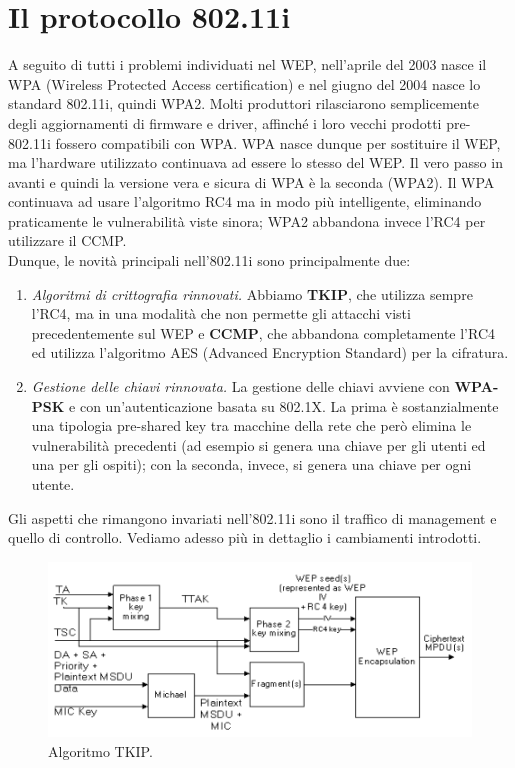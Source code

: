\section{Il protocollo 802.11i}
A seguito di tutti i problemi individuati nel WEP, nell'aprile del 2003 nasce il WPA (Wireless Protected Access certification) e nel giugno del 2004 nasce lo standard 802.11i, quindi WPA2. Molti produttori rilasciarono semplicemente degli aggiornamenti di firmware e driver, affinché i loro vecchi prodotti pre-802.11i fossero compatibili con WPA. WPA nasce dunque per sostituire il WEP, ma l'hardware utilizzato continuava ad essere lo stesso del WEP. Il vero passo in avanti e quindi la versione vera e sicura di WPA è la seconda (WPA2). Il WPA continuava ad usare l'algoritmo RC4 ma in modo più intelligente, eliminando praticamente le vulnerabilità viste sinora; WPA2 abbandona invece l'RC4 per utilizzare il CCMP.\\
Dunque, le novità principali nell'802.11i sono principalmente due:
\begin{enumerate}
	\item \textit{Algoritmi di crittografia rinnovati.} Abbiamo \textbf{TKIP}, che utilizza sempre l'RC4, ma in una modalità che non permette gli attacchi visti precedentemente sul WEP e \textbf{CCMP}, che abbandona completamente l'RC4 ed utilizza l'algoritmo AES (Advanced Encryption Standard) per la cifratura.
	\item \textit{Gestione delle chiavi rinnovata.} La gestione delle chiavi avviene con \textbf{WPA-PSK} e con un'autenticazione basata su 802.1X. La prima è sostanzialmente una tipologia pre-shared key tra macchine della rete che però elimina le vulnerabilità precedenti (ad esempio si genera una chiave per gli utenti ed una per gli ospiti); con la seconda, invece, si genera una chiave per ogni utente.
\end{enumerate}
Gli aspetti che rimangono invariati nell'802.11i sono il traffico di management e quello di controllo. Vediamo adesso più in dettaglio i cambiamenti introdotti.\\
\begin{figure}[htbp]
	\centering
	\includegraphics[scale = 0.3]{images/802_11i-encryption}
	\caption{Algoritmo TKIP.}
	\label{img:802.11i-encryption}
\end{figure}\\

